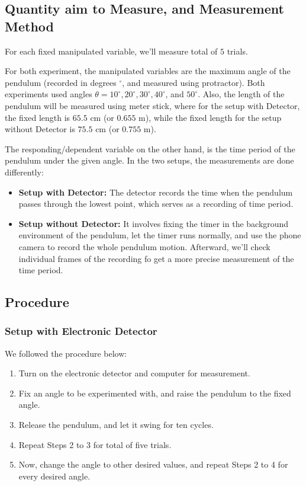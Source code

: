 \documentclass{article}
\begin{document}
\subsection{Quantity aim to Measure, and Measurement Method}
For each fixed manipulated variable, we'll measure total of $5$ trials.

For both experiment, the manipulated variables are the maximum angle of the pendulum (recorded in degrees $ ^\circ$, and measured using protractor). Both experiments used angles $\theta=10^\circ, 20^\circ, 30^\circ, 40^\circ$, and $50^\circ$. Also, the length of the pendulum will be measured using meter stick, where for the setup with Detector, the fixed length is $65.5$ cm (or $0.655$ m), while the fixed length for the setup without Detector is $75.5$ cm (or $0.755$ m).

The responding/dependent variable on the other hand, is the time period of the pendulum under the given angle. In the two setups, the measurements are done differently:
\begin{itemize}
    \item \textbf{Setup with Detector:} The detector records the time when the pendulum passes through the lowest point, which serves as a recording of time period.
    \item \textbf{Setup without Detector:} It involves fixing the timer in the background environment of the pendulum, let the timer runs normally, and use the phone camera to record the whole pendulum motion. Afterward, we'll check individual frames of the recording fo get a more precise measurement of the time period.
\end{itemize}

\subsection{Procedure}
\subsubsection{Setup with Electronic Detector}
We followed the procedure below:
\begin{enumerate}
    \item Turn on the electronic detector and computer for measurement.
    \item Fix an angle to be experimented with, and raise the pendulum to the fixed angle.
    \item Release the pendulum, and let it swing for ten cycles.
    \item Repeat Steps 2 to 3 for total of five trials.
    \item Now, change the angle to other desired values, and repeat Steps 2 to 4 for every desired angle.
\end{enumerate}
\end{document}
